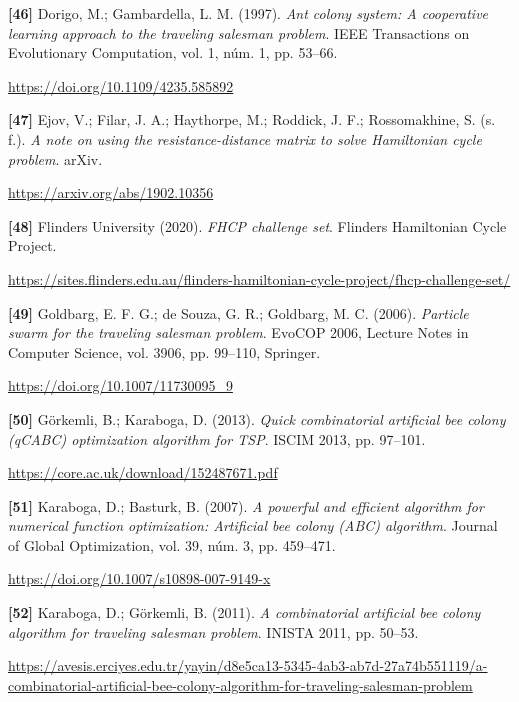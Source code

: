 \documentclass[11pt,a4paper]{article}
\newcommand{\referencia}[1]{\par\addvspace{0.8\baselineskip}\noindent\hangindent=1.1cm\hangafter=1 #1\par\nopagebreak}
\begin{document}
\begin{samepage}
\referencia{\textbf{[46]} Dorigo, M.; Gambardella, L. M. (1997). \textit{Ant colony system: A cooperative learning approach to the traveling salesman problem}. IEEE Transactions on Evolutionary Computation, vol. 1, núm. 1, pp. 53--66.}
 {\small\url{https://doi.org/10.1109/4235.585892}}\par
\end{samepage}
\begin{samepage}
\referencia{\textbf{[47]} Ejov, V.; Filar, J. A.; Haythorpe, M.; Roddick, J. F.; Rossomakhine, S. (s. f.). \textit{A note on using the resistance-distance matrix to solve {Hamiltonian} cycle problem}. arXiv.}
 {\small\url{https://arxiv.org/abs/1902.10356}}\par
\end{samepage}
\begin{samepage}
\referencia{\textbf{[48]} {Flinders University} (2020). \textit{{FHCP} challenge set}. {Flinders Hamiltonian Cycle Project}.}
 {\small\url{https://sites.flinders.edu.au/flinders-hamiltonian-cycle-project/fhcp-challenge-set/}}\par
\end{samepage}
\begin{samepage}
\referencia{\textbf{[49]} Goldbarg, E. F. G.; {de Souza}, G. R.; Goldbarg, M. C. (2006). \textit{Particle swarm for the traveling salesman problem}. {EvoCOP} 2006, Lecture Notes in Computer Science, vol. 3906, pp. 99--110, Springer.}
 {\small\url{https://doi.org/10.1007/11730095_9}}\par
\end{samepage}
\begin{samepage}
\referencia{\textbf{[50]} G{\"o}rkemli, B.; Karaboga, D. (2013). \textit{Quick combinatorial artificial bee colony ({qCABC}) optimization algorithm for {TSP}}. {ISCIM} 2013, pp. 97--101.}
 {\small\url{https://core.ac.uk/download/152487671.pdf}}\par
\end{samepage}
\begin{samepage}
\referencia{\textbf{[51]} Karaboga, D.; Basturk, B. (2007). \textit{A powerful and efficient algorithm for numerical function optimization: Artificial bee colony ({ABC}) algorithm}. Journal of Global Optimization, vol. 39, núm. 3, pp. 459--471.}
 {\small\url{https://doi.org/10.1007/s10898-007-9149-x}}\par
\end{samepage}
\begin{samepage}
\referencia{\textbf{[52]} Karaboga, D.; G{\"o}rkemli, B. (2011). \textit{A combinatorial artificial bee colony algorithm for traveling salesman problem}. {INISTA} 2011, pp. 50--53.}
 {\small\url{https://avesis.erciyes.edu.tr/yayin/d8e5ca13-5345-4ab3-ab7d-27a74b551119/a-combinatorial-artificial-bee-colony-algorithm-for-traveling-salesman-problem}}\par
\end{samepage}
\end{document}
